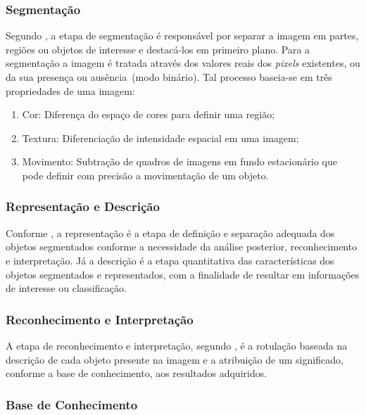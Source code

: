\documentclass[12pt,oneside,a4paper,chapter=TITLE,section=TITLE,sumario=tradicional]{abntex2}
\begin{document}
\subsubsection{Segmentação}

Segundo , a etapa de segmentação é responsável por separar a imagem em partes, regiões ou objetos de interesse e destacá-los em primeiro plano. Para a segmentação a imagem é tratada através dos valores reais dos \textit{pixels} existentes, ou da sua presença ou ausência~(modo binário). Tal processo baseia-se em três propriedades de uma imagem\cite[p.236-237]{solomon2000fundamentos}:

\begin{enumerate}
    \item Cor: Diferença do espaço de cores para definir uma região;
    \item Textura: Diferenciação de intensidade espacial em uma imagem;
    \item Movimento: Subtração de quadros de imagens em fundo estacionário que pode definir com precisão a movimentação de um objeto.
\end{enumerate}

\subsubsection{Representação e Descrição}

Conforme , a representação é a etapa de definição e separação adequada dos objetos segmentados conforme a necessidade da análise posterior, reconhecimento e interpretação. Já a descrição é a etapa quantitativa das características dos objetos segmentados e representados, com a finalidade de resultar em informações de interesse ou classificação.

\subsubsection{Reconhecimento e Interpretação}

A etapa de reconhecimento e interpretação, segundo , é a rotulação baseada na descrição de cada objeto presente na imagem e a atribuição de um significado, conforme a base de conhecimento, aos resultados adquiridos.

\subsubsection{Base de Conhecimento}
\end{document}
